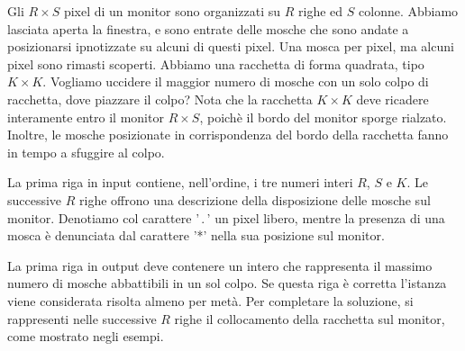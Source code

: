 \renewcommand{\nomebreve}{mosche}
\renewcommand{\titolo}{Mosche (da coci 2015-16, round 7, task 2)}

\introduzione{}

Gli $R\times S$ pixel di un monitor sono organizzati su $R$ righe ed $S$ colonne.
Abbiamo lasciata aperta la finestra, e sono entrate delle mosche che sono andate a posizionarsi ipnotizzate su alcuni di questi pixel.
Una mosca per pixel, ma alcuni pixel sono rimasti scoperti.
Abbiamo una racchetta di forma quadrata, tipo $K\times K$.
Vogliamo uccidere il maggior numero di mosche con un solo colpo di racchetta,
dove piazzare il colpo?
Nota che la racchetta $K\times K$ deve ricadere interamente entro il monitor $R\times S$,
poich\`e il bordo del monitor sporge rialzato.
Inoltre, le mosche posizionate in corrispondenza del bordo della racchetta
fanno in tempo a sfuggire al colpo. 


La prima riga in input contiene, nell'ordine,
i tre numeri interi $R$, $S$ e $K$.
Le successive $R$ righe offrono una descrizione
della disposizione delle mosche sul monitor.
Denotiamo col carattere '\,.\,' un pixel libero, mentre la presenza di una mosca
\`e denunciata dal carattere '*' nella sua posizione sul monitor.

La prima riga in output deve contenere un intero
che rappresenta il massimo numero di mosche abbattibili in un sol colpo.
Se questa riga \`e corretta l'istanza viene considerata risolta almeno per met\`a.
Per completare la soluzione,
si rappresenti nelle successive $R$ righe il collocamento della racchetta
sul monitor, come mostrato negli esempi. 




